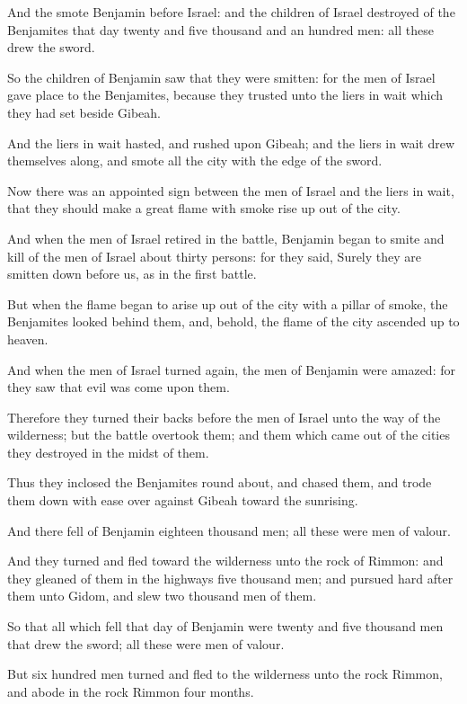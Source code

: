 \Verse And the \LORD smote Benjamin before Israel: and the children of Israel destroyed of the Benjamites that day twenty and five thousand and an hundred men: all these drew the sword.

\Verse So the children of Benjamin saw that they were smitten: for the men of Israel gave place to the Benjamites, because they trusted unto the liers in wait which they had set beside Gibeah.

\Verse And the liers in wait hasted, and rushed upon Gibeah; and the liers in wait drew themselves along, and smote all the city with the edge of the sword.

\Verse Now there was an appointed sign between the men of Israel and the liers in wait, that they should make a great flame with smoke rise up out of the city.

\Verse And when the men of Israel retired in the battle, Benjamin began to smite and kill of the men of Israel about thirty persons: for they said, Surely they are smitten down before us, as in the first battle.

\Verse But when the flame began to arise up out of the city with a pillar of smoke, the Benjamites looked behind them, and, behold, the flame of the city ascended up to heaven.

\Verse And when the men of Israel turned again, the men of Benjamin were amazed: for they saw that evil was come upon them.

\Verse Therefore they turned their backs before the men of Israel unto the way of the wilderness; but the battle overtook them; and them which came out of the cities they destroyed in the midst of them.

\Verse Thus they inclosed the Benjamites round about, and chased them, and trode them down with ease over against Gibeah toward the sunrising.

\Verse And there fell of Benjamin eighteen thousand men; all these were men of valour.

\Verse And they turned and fled toward the wilderness unto the rock of Rimmon: and they gleaned of them in the highways five thousand men; and pursued hard after them unto Gidom, and slew two thousand men of them.

\Verse So that all which fell that day of Benjamin were twenty and five thousand men that drew the sword; all these were men of valour.

\Verse But six hundred men turned and fled to the wilderness unto the rock Rimmon, and abode in the rock Rimmon four months.

